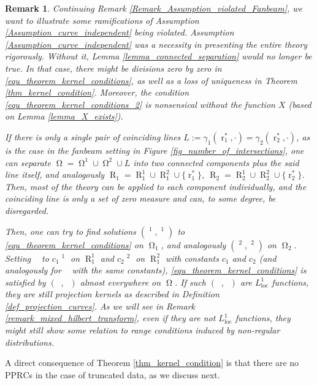 \documentclass[12pt]{article}
\newtheorem{remark}[theorem]{Remark}
\DeclareMathOperator{\rayvariable}{r}
\DeclareMathOperator{\raygroundset}{R}
\DeclareMathOperator{\Vone}{V_1}
\DeclareMathOperator{\Vtwo}{V_2}
\newcommand{\conditionname}{$\mathrm{PPRC}$}
\DeclareMathOperator{\imgdom}{{\Omega}}
\begin{document}
\begin{remark}
\label{remark_assumption_has_failed}
Continuing Remark \ref{Remark_Assumption_violated_Fanbeam}, we want to illustrate some ramifications of Assumption \ref{Assumption_curve_independent} being violated. 
Assumption \ref{Assumption_curve_independent} was a necessity in presenting the entire theory rigorously. Without it, Lemma \ref{lemma_connected_separation} would no longer be true. In that case, there might be divisions zero by zero in \eqref{equ_theorem_kernel_conditions}, as well as a loss of uniqueness in Theorem \ref{thm_kernel_condition}. Moreover, the condition \eqref{equ_theorem_kernel_conditions_2} is nonsensical without the function $X$ (based on Lemma \ref{lemma_X_exists}).

If there is only a single pair of coinciding lines $L:=\gamma_1(\rayvariable_1^*,\cdot)=\gamma_2(\rayvariable_2^*,\cdot)$, as is the case in the fanbeam setting in Figure \ref{fig_number_of_intersections}, one can separate $\imgdom=\imgdom^1\cup \imgdom^2\cup L$ into two connected components plus the said line itself, and analogously $\raygroundset_1=\raygroundset_1^1\cup \raygroundset_1^2\cup\{\rayvariable_1^*\}$, $\raygroundset_2=\raygroundset_2^1\cup \raygroundset_2^2\cup\{\rayvariable_2^*\}$. 
Then, most of the theory can be applied to each component individually, and the coinciding line is only a set of zero measure and can, to some degree, be disregarded.

Then, one can try to find solutions $(\Vone^1,\Vtwo^1)$ to \eqref{equ_theorem_kernel_conditions} on $\imgdom_1$, and analogously $(\Vone^2,\Vtwo^2)$ on $\imgdom_2$. Setting $\Vone$ to $c_1\Vone^1$ on $\raygroundset_1^1$ and $c_2\Vone^2$ on $\raygroundset_1^2$ with constants $c_1$ and $c_2$ (and analogously for $\Vtwo$ with the same constants), \eqref{equ_theorem_kernel_conditions} is satisfied by $(\Vone,\Vtwo)$ almost everywhere on $\imgdom$. If such $(\Vone,\Vtwo)$ are $L^1_{\text{loc}}$ functions, they are still projection kernels as described in Definition \ref{def_projection_curves}. As we will see in Remark \ref{remark_mixed_hilbert_transform}, even if they are not $L^1_\text{loc}$ functions, they might still show some relation to range conditions induced by non-regular distributions. 
\end{remark}


A direct consequence of Theorem \ref{thm_kernel_condition} is that there are no \conditionname s in the case of truncated data, as we discuss next.
\end{document}
